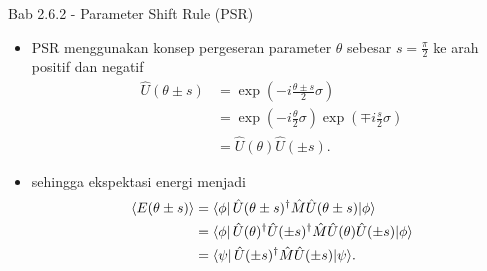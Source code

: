 \begin{frame}{Bab 2.6.2 - Parameter Shift Rule (PSR)}
    \begin{itemize}
        \item PSR menggunakan konsep pergeseran parameter $\theta$ sebesar $s = \frac{\pi}{2}$ ke arah positif dan negatif
        \begin{equation}
            \begin{split}
            \hat{U}(\theta \pm s) &= \exp\left(-i\frac{\theta \pm s}{2}\sigma\right) \\
            &= \exp\left(-i\frac{\theta}{2}\sigma\right) \exp\left(\mp i\frac{s}{2}\sigma\right) \\
            &= \hat{U}(\theta) \hat{U}(\pm s).
            \end{split}
        \end{equation}
        \item sehingga ekspektasi energi menjadi
        \begin{equation*}
            \begin{split}
            \langle E(\theta\pm s)\rangle &= \bra{\phi}\hat{U}(\theta\pm s)^{\dagger}\hat{M}\hat{U}(\theta\pm s)|\phi\rangle \\
            &= \bra{\phi}\hat{U}(\theta)^{\dagger}\hat{U}(\pm s)^{\dagger}\hat{M}\hat{U}(\theta)\hat{U}(\pm s)|\phi\rangle \\
            &= \bra{\psi} \hat{U}(\pm s)^{\dagger}\hat{M}\hat{U}(\pm s)|\psi\rangle.
            \end{split}
        \end{equation*}
    \end{itemize}
\end{frame}

